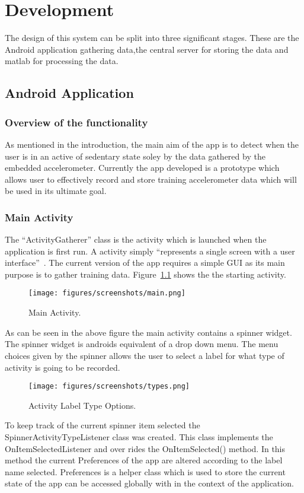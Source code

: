 \chapter{Development} %
\label{cha:chapter_development}

The design of this system can be split into three significant stages. These are the Android application gathering data,the central server for storing the data and matlab for processing the data. 

\section{Android Application} %
\label{sec:section_app}

\subsection{Overview of the functionality} %
\label{sub:subsection_appoverview}
As mentioned in the introduction, the main aim of the app is to detect when the user is in an active of sedentary state soley by the data gathered by the embedded accelerometer. Currently the app developed is a prototype which allows user to effectively record and store training accelerometer data which will be used in its ultimate goal.

\subsection{Main Activity} %
\label{sub:subsection_mainactivity}
The ``ActivityGatherer'' class is the activity which is launched when the application is first run. A activity simply ``represents a single screen with a user interface''~\cite{android2013fundamentals}. The current version of the app requires a simple GUI as its main purpose is to gather training data. Figure~\ref{fig:main-activity} shows the the starting activity.
\begin{figure}[h]
  \texttt{[image: figures/screenshots/main.png]}
  \caption{Main Activity.}
  \label{fig:main-activity}
\end{figure}
As can be seen in the above figure the main activity contains a spinner widget. The spinner widget is androids equivalent of a drop down menu. The menu choices given by the spinner allows the user to select a label for what type of activity is going to be recorded. 
\begin{figure}[h]
  \texttt{[image: figures/screenshots/types.png]}
  \caption{Activity Label Type Options.}
  \label{fig:type-choice}
\end{figure}
To keep track of the current spinner item selected the SpinnerActivityTypeListener class was created. This class implements the OnItemSelectedListener and over rides the OnItemSelected() method. In this method the current Preferences of the app are altered according to the label name selected. Preferences is a helper class which is used to store the current state of the app can be accessed globally with in the context of the application.
